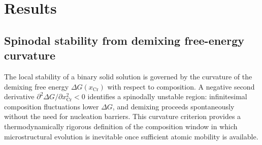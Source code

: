 \documentclass[final,3p,times]{elsarticle}
\begin{document}







\section{Results}

\subsection{Spinodal stability from demixing free-energy curvature}

The local stability of a binary solid solution is governed by the curvature of the demixing free energy $\Delta G(x_{\mathrm{Cr}})$ with respect to composition. A negative second derivative $\partial^2 \Delta G/\partial x_{\mathrm{Cr}}^2 < 0$ identifies a spinodally unstable region: infinitesimal composition fluctuations lower $\Delta G$, and demixing proceeds spontaneously without the need for nucleation barriers. This curvature criterion provides a thermodynamically rigorous definition of the composition window in which microstructural evolution is inevitable once sufficient atomic mobility is available.
\end{document}
